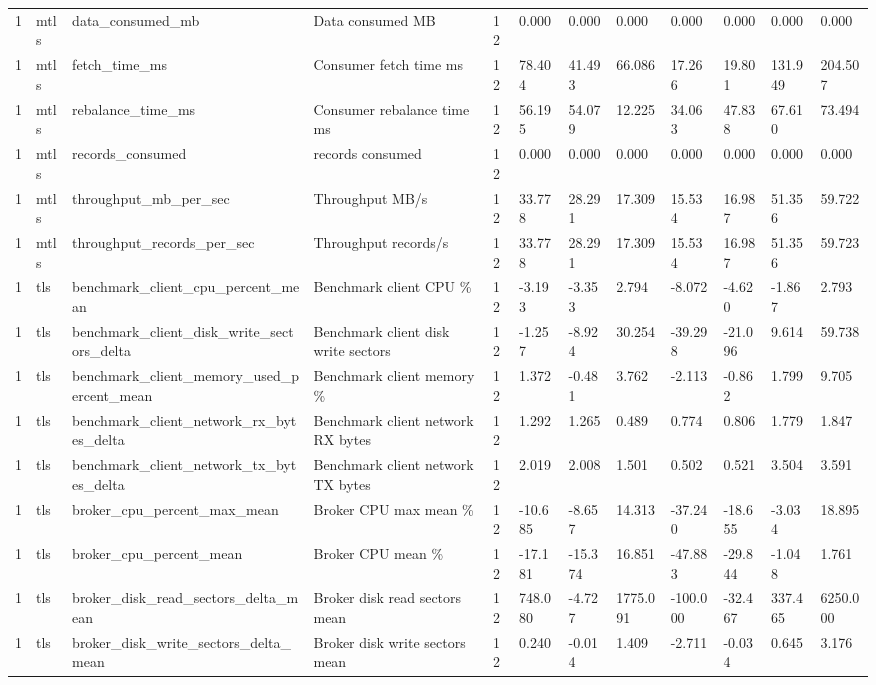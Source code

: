 \begin{longtable}{llllllllllll}
1 & mtls & data\_consumed\_mb & Data consumed MB & 12 & 0.000 & 0.000 & 0.000 & 0.000 & 0.000 & 0.000 & 0.000 \\
1 & mtls & fetch\_time\_ms & Consumer fetch time ms & 12 & 78.404 & 41.493 & 66.086 & 17.266 & 19.801 & 131.949 & 204.507 \\
1 & mtls & rebalance\_time\_ms & Consumer rebalance time ms & 12 & 56.195 & 54.079 & 12.225 & 34.063 & 47.838 & 67.610 & 73.494 \\
1 & mtls & records\_consumed & records consumed & 12 & 0.000 & 0.000 & 0.000 & 0.000 & 0.000 & 0.000 & 0.000 \\
1 & mtls & throughput\_mb\_per\_sec & Throughput MB/s & 12 & 33.778 & 28.291 & 17.309 & 15.534 & 16.987 & 51.356 & 59.722 \\
1 & mtls & throughput\_records\_per\_sec & Throughput records/s & 12 & 33.778 & 28.291 & 17.309 & 15.534 & 16.987 & 51.356 & 59.723 \\
1 & tls & benchmark\_client\_cpu\_percent\_mean & Benchmark client CPU \% & 12 & -3.193 & -3.353 & 2.794 & -8.072 & -4.620 & -1.867 & 2.793 \\
1 & tls & benchmark\_client\_disk\_write\_sectors\_delta & Benchmark client disk write sectors & 12 & -1.257 & -8.924 & 30.254 & -39.298 & -21.096 & 9.614 & 59.738 \\
1 & tls & benchmark\_client\_memory\_used\_percent\_mean & Benchmark client memory \% & 12 & 1.372 & -0.481 & 3.762 & -2.113 & -0.862 & 1.799 & 9.705 \\
1 & tls & benchmark\_client\_network\_rx\_bytes\_delta & Benchmark client network RX bytes & 12 & 1.292 & 1.265 & 0.489 & 0.774 & 0.806 & 1.779 & 1.847 \\
1 & tls & benchmark\_client\_network\_tx\_bytes\_delta & Benchmark client network TX bytes & 12 & 2.019 & 2.008 & 1.501 & 0.502 & 0.521 & 3.504 & 3.591 \\
1 & tls & broker\_cpu\_percent\_max\_mean & Broker CPU max mean \% & 12 & -10.685 & -8.657 & 14.313 & -37.240 & -18.655 & -3.034 & 18.895 \\
1 & tls & broker\_cpu\_percent\_mean & Broker CPU mean \% & 12 & -17.181 & -15.374 & 16.851 & -47.883 & -29.844 & -1.048 & 1.761 \\
1 & tls & broker\_disk\_read\_sectors\_delta\_mean & Broker disk read sectors mean & 12 & 748.080 & -4.727 & 1775.091 & -100.000 & -32.467 & 337.465 & 6250.000 \\
1 & tls & broker\_disk\_write\_sectors\_delta\_mean & Broker disk write sectors mean & 12 & 0.240 & -0.014 & 1.409 & -2.711 & -0.034 & 0.645 & 3.176 \\

\end{longtable}
